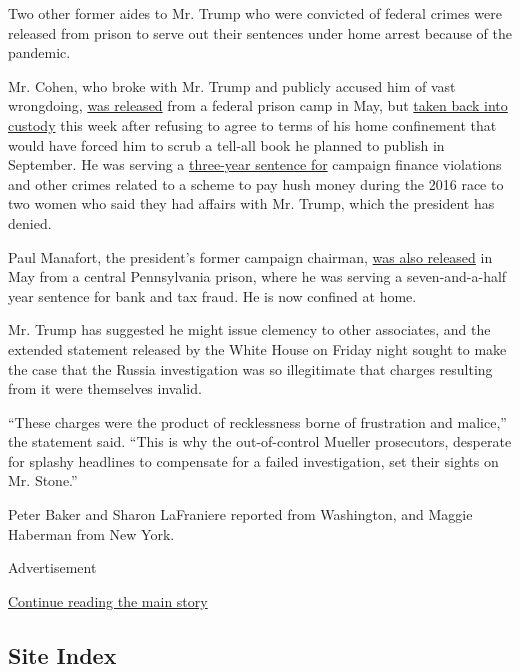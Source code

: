 Two other former aides to Mr. Trump who were convicted of federal crimes
were released from prison to serve out their sentences under home arrest
because of the pandemic.

Mr. Cohen, who broke with Mr. Trump and publicly accused him of vast
wrongdoing,
\href{https://www.nytimes.com/2020/05/20/nyregion/michael-cohen-coronavirus-prison-release.html}{was
released} from a federal prison camp in May, but
\href{https://www.nytimes.com/2020/07/09/nyregion/michael-cohen-arrested.html}{taken
back into custody} this week after refusing to agree to terms of his
home confinement that would have forced him to scrub a tell-all book he
planned to publish in September. He was serving a
\href{https://www.nytimes.com/2018/12/12/nyregion/michael-cohen-sentence-trump.html}{three-year
sentence for} campaign finance violations and other crimes related to a
scheme to pay hush money during the 2016 race to two women who said they
had affairs with Mr. Trump, which the president has denied.

Paul Manafort, the president's former campaign chairman,
\href{https://www.nytimes.com/2020/05/13/us/politics/paul-manafort-released-coronavirus.html}{was
also released} in May from a central Pennsylvania prison, where he was
serving a seven-and-a-half year sentence for bank and tax fraud. He is
now confined at home.

Mr. Trump has suggested he might issue clemency to other associates, and
the extended statement released by the White House on Friday night
sought to make the case that the Russia investigation was so
illegitimate that charges resulting from it were themselves invalid.

``These charges were the product of recklessness borne of frustration
and malice,'' the statement said. ``This is why the out-of-control
Mueller prosecutors, desperate for splashy headlines to compensate for a
failed investigation, set their sights on Mr. Stone.''

Peter Baker and Sharon LaFraniere reported from Washington, and Maggie
Haberman from New York.

Advertisement

\protect\hyperlink{after-bottom}{Continue reading the main story}

\hypertarget{site-index}{%
\subsection{Site Index}\label{site-index}}

